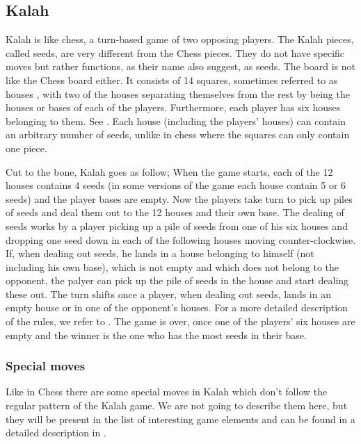 \subsection{Kalah}

Kalah is like chess, a turn-based game of two opposing players. The Kalah pieces,
called seeds, are very different from the Chess pieces. They do not have
specific moves but rather functions, as their name also suggest, as seeds. The
board is not like the Chess board either. It consists of 14 squares, sometimes
referred to as houses \cite{kalahrules}, with two of the houses separating
themselves from the rest by being the houses or bases of each of the players.
Furthermore, each player has six houses belonging to them. See
. Each house (including the players' houses) can contain an
arbitrary number of seeds, unlike in chess where the squares can only contain
one piece.  

Cut to the bone, Kalah goes as follow; When the game starts, each of the 12
houses contains 4 seeds (in some versions of the game each house contain 5 or 6
seeds) and the player bases are empty. Now the players take turn to pick up
piles of seeds and deal them out to the 12 houses and their own base. The
dealing of seeds works by a player picking up a pile of seeds from one of his
six houses and dropping one seed down in each of the following houses moving
counter-clockwise. If, when dealing out seeds, he lands in a house belonging to
himself (not including his own base), which is not empty and which does not
belong to the opponent, the palyer can pick up the pile of seeds in the house
and start dealing these out. The turn shifts once a player, when dealing out
seeds, lands in an empty house or in one of the opponent's houses. For a more
detailed description of the rules, we refer to \cite{kalahrules}. The game is
over, once one of the players' six houses are empty and the winner is the one
who has the most seeds in their base.


\subsubsection{Special moves}
Like in Chess there are some special moves in Kalah which don't follow the
regular pattern of the Kalah game. We are not going to describe them here, but
they will be present in the list of interesting game elements and can be found
in a detailed description in \cite{kalahrules}.

